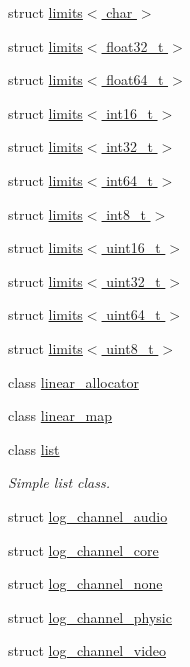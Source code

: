 \begin{DoxyCompactItemize}
struct \hyperlink{structcrap_1_1limits_3_01char_01_4}{limits$<$ char $>$}
\item 
struct \hyperlink{structcrap_1_1limits_3_01float32__t_01_4}{limits$<$ float32\+\_\+t $>$}
\item 
struct \hyperlink{structcrap_1_1limits_3_01float64__t_01_4}{limits$<$ float64\+\_\+t $>$}
\item 
struct \hyperlink{structcrap_1_1limits_3_01int16__t_01_4}{limits$<$ int16\+\_\+t $>$}
\item 
struct \hyperlink{structcrap_1_1limits_3_01int32__t_01_4}{limits$<$ int32\+\_\+t $>$}
\item 
struct \hyperlink{structcrap_1_1limits_3_01int64__t_01_4}{limits$<$ int64\+\_\+t $>$}
\item 
struct \hyperlink{structcrap_1_1limits_3_01int8__t_01_4}{limits$<$ int8\+\_\+t $>$}
\item 
struct \hyperlink{structcrap_1_1limits_3_01uint16__t_01_4}{limits$<$ uint16\+\_\+t $>$}
\item 
struct \hyperlink{structcrap_1_1limits_3_01uint32__t_01_4}{limits$<$ uint32\+\_\+t $>$}
\item 
struct \hyperlink{structcrap_1_1limits_3_01uint64__t_01_4}{limits$<$ uint64\+\_\+t $>$}
\item 
struct \hyperlink{structcrap_1_1limits_3_01uint8__t_01_4}{limits$<$ uint8\+\_\+t $>$}
\item 
class \hyperlink{classcrap_1_1linear__allocator}{linear\+\_\+allocator}
\item 
class \hyperlink{classcrap_1_1linear__map}{linear\+\_\+map}
\item 
class \hyperlink{classcrap_1_1list}{list}
\begin{DoxyCompactList}\small\item\em Simple list class. \end{DoxyCompactList}\item 
struct \hyperlink{structcrap_1_1log__channel__audio}{log\+\_\+channel\+\_\+audio}
\item 
struct \hyperlink{structcrap_1_1log__channel__core}{log\+\_\+channel\+\_\+core}
\item 
struct \hyperlink{structcrap_1_1log__channel__none}{log\+\_\+channel\+\_\+none}
\item 
struct \hyperlink{structcrap_1_1log__channel__physic}{log\+\_\+channel\+\_\+physic}
\item 
struct \hyperlink{structcrap_1_1log__channel__video}{log\+\_\+channel\+\_\+video}
\item 

\end{DoxyCompactItemize}
